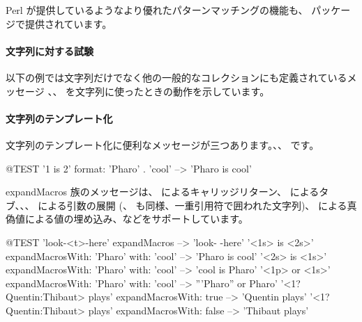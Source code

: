 \documentclass[a4paper,10pt,twoside]{book}
\begin{document}
Perl が提供しているようなより優れたパターンマッチングの機能も、 パッケージで提供されています。

\paragraph{文字列に対する試験} 以下の例では文字列だけでなく他の一般的なコレクションにも定義されているメッセージ \mbox{、}、 を文字列に使ったときの動作を示しています。


\paragraph{文字列のテンプレート化}
文字列のテンプレート化に便利なメッセージが三つあります。、、 です。

\begin{code}{@TEST}
'{1} is {2}' format: {'Pharo' . 'cool'}  --> 'Pharo is cool'
\end{code}

expandMacros 族のメッセージは、 によるキャリッジリターン、 によるタブ、、、 による引数の展開 (、 も同様、一重引用符で囲われた文字列)、 による真偽値による値の埋め込み、などをサポートしています。


\begin{code}{@TEST}
'look-<t>-here' expandMacros                                         --> 'look-	-here'
'<1s> is <2s>' expandMacrosWith: 'Pharo' with: 'cool'   --> 'Pharo is cool'
'<2s> is <1s>' expandMacrosWith: 'Pharo' with: 'cool'   --> 'cool is Pharo'
'<1p> or <1s>' expandMacrosWith: 'Pharo' with: 'cool'  --> '''Pharo'' or Pharo'
'<1?Quentin:Thibaut> plays' expandMacrosWith: true     --> 'Quentin plays'
'<1?Quentin:Thibaut> plays' expandMacrosWith: false    --> 'Thibaut plays'
\end{code}
\end{document}
